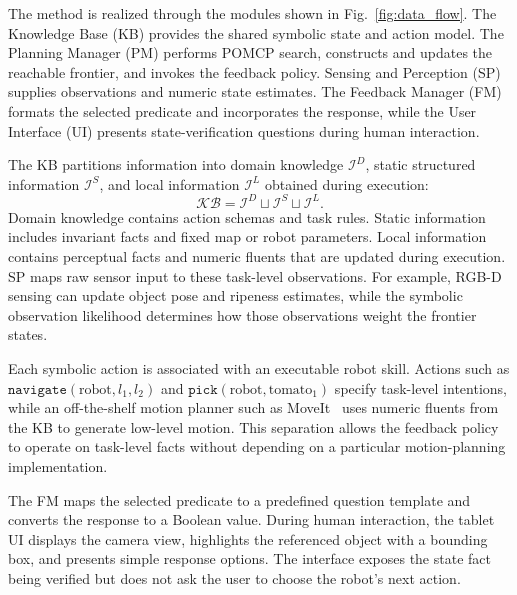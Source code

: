 The method is realized through the modules shown in Fig.~\ref{fig:data_flow}. The Knowledge Base (KB) provides the shared symbolic state and action model. The Planning Manager (PM) performs POMCP search, constructs and updates the reachable frontier, and invokes the feedback policy. Sensing and Perception (SP) supplies observations and numeric state estimates. The Feedback Manager (FM) formats the selected predicate and incorporates the response, while the User Interface (UI) presents state-verification questions during human interaction.

\label{method:KB}
The KB partitions information into domain knowledge $\mathcal{I}^{D}$, static structured information $\mathcal{I}^{S}$, and local information $\mathcal{I}^{L}$ obtained during execution:
\[
\mathcal{KB}=\mathcal{I}^{D}\sqcup\mathcal{I}^{S}\sqcup\mathcal{I}^{L}.
\]
Domain knowledge contains action schemas and task rules. Static information includes invariant facts and fixed map or robot parameters. Local information contains perceptual facts and numeric fluents that are updated during execution. SP maps raw sensor input to these task-level observations. For example, RGB-D sensing can update object pose and ripeness estimates, while the symbolic observation likelihood determines how those observations weight the frontier states.

\label{method:action_execution}
Each symbolic action is associated with an executable robot skill. Actions such as $\texttt{navigate}(\text{robot},l_1,l_2)$ and $\texttt{pick}(\text{robot},\text{tomato}_1)$ specify task-level intentions, while an off-the-shelf motion planner such as MoveIt~\cite{chitta2012moveit} uses numeric fluents from the KB to generate low-level motion. This separation allows the feedback policy to operate on task-level facts without depending on a particular motion-planning implementation.

\label{method:FM}
The FM maps the selected predicate to a predefined question template and converts the response to a Boolean value. During human interaction, the tablet UI displays the camera view, highlights the referenced object with a bounding box, and presents simple response options. The interface exposes the state fact being verified but does not ask the user to choose the robot's next action.
